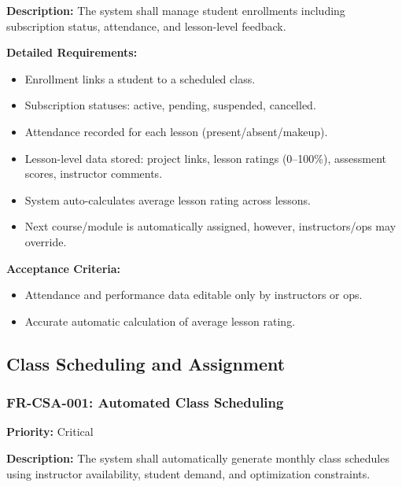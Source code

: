 \textbf{Description:} The system shall manage student enrollments including subscription status, attendance, and lesson-level feedback.

\textbf{Detailed Requirements:}
\begin{itemize}
    \item Enrollment links a student to a scheduled class.
    \item Subscription statuses: active, pending, suspended, cancelled.
    \item Attendance recorded for each lesson (present/absent/makeup).
    \item Lesson-level data stored: project links, lesson ratings (0--100\%), assessment scores, instructor comments.
    \item System auto-calculates average lesson rating across lessons.
    \item Next course/module is automatically assigned, however, instructors/ops may override.
\end{itemize}

\textbf{Acceptance Criteria:}
\begin{itemize}
    \item Attendance and performance data editable only by instructors or ops.
    \item Accurate automatic calculation of average lesson rating.
\end{itemize}

\subsection{Class Scheduling and Assignment}

\subsubsection{FR-CSA-001: Automated Class Scheduling}
\textbf{Priority:} Critical  

\textbf{Description:} The system shall automatically generate monthly class schedules using instructor availability, student demand, and optimization constraints.

